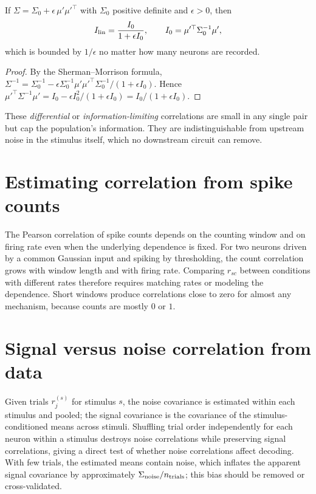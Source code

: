 \begin{proposition}
If $\Sigma=\Sigma_0+\epsilon\,\mu'\mu'^\top$ with $\Sigma_0$ positive definite and $\epsilon>0$, then
\[
I_{\rm lin}=\frac{I_0}{1+\epsilon I_0},\qquad I_0=\mu'^\top\Sigma_0^{-1}\mu',
\]
which is bounded by $1/\epsilon$ no matter how many neurons are recorded.
\end{proposition}
\begin{proof}
By the Sherman--Morrison formula, $\Sigma^{-1}=\Sigma_0^{-1}-\epsilon\Sigma_0^{-1}\mu'\mu'^\top\Sigma_0^{-1}/(1+\epsilon I_0)$. Hence $\mu'^\top\Sigma^{-1}\mu'=I_0-\epsilon I_0^2/(1+\epsilon I_0)=I_0/(1+\epsilon I_0)$.
\end{proof}
These \emph{differential} or \emph{information-limiting} correlations are small in any single pair but cap the population's information. They are indistinguishable from upstream noise in the stimulus itself, which no downstream circuit can remove.

\section{Estimating correlation from spike counts}
The Pearson correlation of spike counts depends on the counting window and on firing rate even when the underlying dependence is fixed. For two neurons driven by a common Gaussian input and spiking by thresholding, the count correlation grows with window length and with firing rate. Comparing $r_{sc}$ between conditions with different rates therefore requires matching rates or modeling the dependence. Short windows produce correlations close to zero for almost any mechanism, because counts are mostly $0$ or $1$.

\section{Signal versus noise correlation from data}
Given trials $r_{j}^{(s)}$ for stimulus $s$, the noise covariance is estimated within each stimulus and pooled; the signal covariance is the covariance of the stimulus-conditioned means across stimuli. Shuffling trial order independently for each neuron within a stimulus destroys noise correlations while preserving signal correlations, giving a direct test of whether noise correlations affect decoding. With few trials, the estimated means contain noise, which inflates the apparent signal covariance by approximately $\Sigma_{\rm noise}/n_{\rm trials}$; this bias should be removed or cross-validated.


